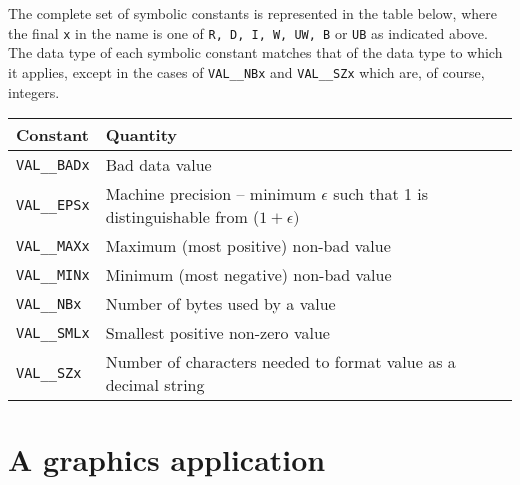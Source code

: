 The complete set of symbolic constants is represented in the table below,
where the final {\tt x}  in the name is one of 
{\tt R, D, I, W, UW, B} or {\tt UB}  as indicated above.
The data type of each symbolic constant matches that of the 
data type to which it applies, except in the cases of
{\tt VAL\_\_NBx} and {\tt VAL\_\_SZx} which are, of course, integers.
\begin{center}
\begin{tabular}{|l|l|} \hline
{\bf Constant   }& {\bf Quantity }\\ \hline
{\tt VAL\_\_BADx}        & Bad data value\\
{\tt VAL\_\_EPSx}        & Machine precision -- minimum $\epsilon$ such that 
1 is distinguishable from ($1+\epsilon)$\\
{\tt VAL\_\_MAXx}        & Maximum (most positive) non-bad value\\ 
{\tt VAL\_\_MINx}        & Minimum (most negative) non-bad value\\
{\tt VAL\_\_NBx}         & Number of bytes used by a value\\
{\tt VAL\_\_SMLx}        & Smallest positive non-zero value\\
{\tt VAL\_\_SZx}         & Number of characters needed to format value as a decimal string\\
\hline
\end{tabular}
\end{center}

\newpage
\section{A graphics application\label{graph}}

